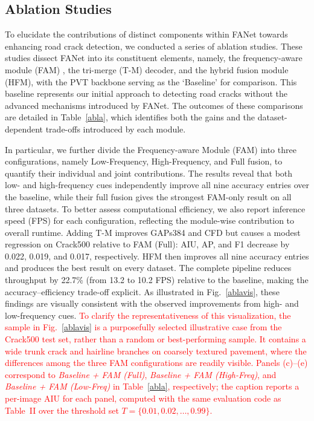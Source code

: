 \documentclass[journal]{IEEEtran}
\begin{document}
\subsection{Ablation Studies}
To elucidate the contributions of distinct components within FANet towards enhancing road crack detection, we conducted a series of ablation studies. These studies dissect FANet into its constituent elements, namely, the frequency-aware module (FAM) , the tri-merge (T-M) decoder, and the hybrid fusion module (HFM), with the PVT backbone serving as the `Baseline’ for comparison. This baseline represents our initial approach to detecting road cracks without the advanced mechanisms introduced by FANet. 
%
The outcomes of these comparisons are detailed in Table~\ref{abla}, which identifies both the gains and the dataset-dependent trade-offs introduced by each module.

In particular, we further divide the Frequency-aware Module (FAM) into three configurations, namely Low-Frequency, High-Frequency, and Full fusion, to quantify their individual and joint contributions.
The results reveal that both low- and high-frequency cues independently improve all nine accuracy entries over the baseline, while their full fusion gives the strongest FAM-only result on all three datasets.
To better assess computational efficiency, we also report inference speed (FPS) for each configuration, reflecting the module-wise contribution to overall runtime.
Adding T-M improves GAPs384 and CFD but causes a modest regression on Crack500 relative to FAM (Full): AIU, AP, and F1 decrease by 0.022, 0.019, and 0.017, respectively. HFM then improves all nine accuracy entries and produces the best result on every dataset. The complete pipeline reduces throughput by 22.7\% (from 13.2 to 10.2 FPS) relative to the baseline, making the accuracy--efficiency trade-off explicit.
As illustrated in Fig.~\ref{ablavis}, these findings are visually consistent with the observed improvements from high- and low-frequency cues.
\textcolor{red}{To clarify the representativeness of this visualization, the sample in Fig.~\ref{ablavis} is a purposefully selected illustrative case from the Crack500 test set, rather than a random or best-performing sample. It contains a wide trunk crack and hairline branches on coarsely textured pavement, where the differences among the three FAM configurations are readily visible. Panels (c)--(e) correspond to \emph{Baseline + FAM (Full)}, \emph{Baseline + FAM (High-Freq)}, and \emph{Baseline + FAM (Low-Freq)} in Table~\ref{abla}, respectively; the caption reports a per-image AIU for each panel, computed with the same evaluation code as Table~II over the threshold set $T=\{0.01, 0.02, \ldots, 0.99\}$.}
\end{document}
